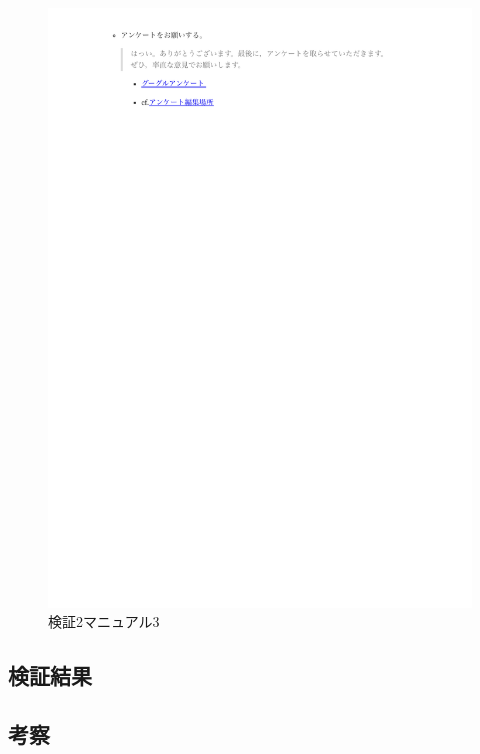     \vspace{4cm}%
    \begin{figure}[H]
        \includegraphics[width=15cm]{./fig/chapter4/inspect_2/manual/manual_3.pdf}
        \caption{検証2マニュアル3}
        \label{検証２マニュアル３}
    \end{figure}



  \subsection{検証結果}
  \subsection{考察}


